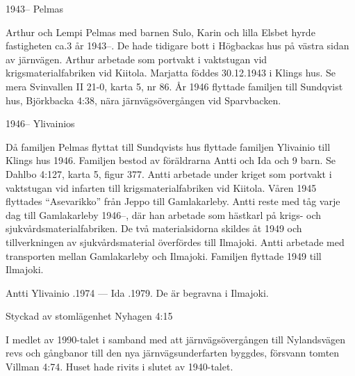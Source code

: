 
1943--	Pelmas

Arthur och Lempi Pelmas med barnen Sulo, Karin och lilla Elsbet hyrde fastigheten ca.3 år 1943--. De hade tidigare bott i Högbackas hus på västra sidan av järnvägen. Arthur arbetade som portvakt i vaktstugan vid 	krigsmaterialfabriken vid Kiitola. Marjatta föddes 30.12.1943 i Klings hus. Se mera Svinvallen II 21-0, karta 5, nr 86. År 1946 flyttade familjen till Sundqvist hus, Björkbacka 4:38, nära järnvägsövergången vid Sparvbacken.

1946--	Ylivainios

Då familjen Pelmas flyttat till Sundqvists hus flyttade familjen Ylivainio till Klings hus 1946. Familjen bestod av föräldrarna Antti och Ida och 9 barn. Se Dahlbo 4:127, karta 5, figur 377. Antti arbetade under kriget som portvakt i vaktstugan vid infarten till krigsmaterialfabriken vid Kiitola. Våren 1945 flyttades ``Asevarikko'' från Jeppo till Gamlakarleby. Antti reste med tåg varje dag till Gamlakarleby 1946--, där han arbetade som hästkarl på krigs- och sjukvårdsmaterialfabriken. De två materialsidorna skildes åt 1949 och tillverkningen av sjukvårdsmaterial överfördes till Ilmajoki. Antti arbetade med transporten mellan Gamlakarleby och Ilmajoki. Familjen flyttade 1949 till Ilmajoki.

Antti Ylivainio .1974  ---  Ida .1979. De är begravna i Ilmajoki.




Styckad av stomlägenhet Nyhagen 4:15

I medlet av 1990-talet i samband med att järnvägsövergången till Nylandsvägen revs och gångbanor till den nya järnvägsunderfarten	byggdes, försvann tomten Villman 4:74. Huset hade rivits i slutet av 1940-talet.


